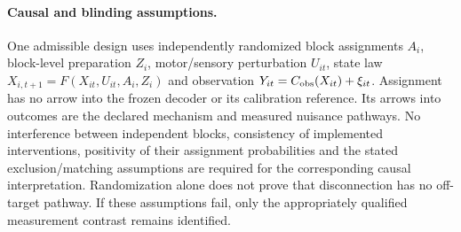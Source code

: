 \documentclass[11pt,a4paper]{article}
\theoremstyle{definition}
\begin{document}
\paragraph{Causal and blinding assumptions.}
One admissible design uses independently randomized block assignments $A_i$, block-level preparation $Z_i$, motor/sensory perturbation $U_{it}$, state law $X_{i,t+1}=F(X_{it},U_{it},A_i,Z_i)$ and observation $Y_{it}=C_{\rm obs}(X_{it})+\xi_{it}$. Assignment has no arrow into the frozen decoder or its calibration reference. Its arrows into outcomes are the declared mechanism and measured nuisance pathways. No interference between independent blocks, consistency of implemented interventions, positivity of their assignment probabilities and the stated exclusion/matching assumptions are required for the corresponding causal interpretation. Randomization alone does not prove that disconnection has no off-target pathway. If these assumptions fail, only the appropriately qualified measurement contrast remains identified.
\end{document}

